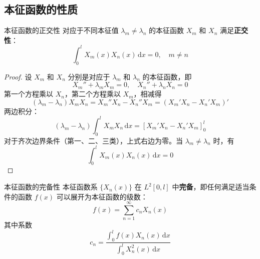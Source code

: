 \subsection{本征函数的性质}

\begin{dingli}{本征函数的正交性}{}
对应于不同本征值 $\lambda_m \neq \lambda_n$ 的本征函数 $X_m$ 和 $X_n$ 满足\textbf{正交性}：
\begin{equation}
    \int_0^l X_m(x)X_n(x)\,\mathrm{d}x = 0, \quad m \neq n
\end{equation}
\end{dingli}

\begin{proof}
设 $X_m$ 和 $X_n$ 分别是对应于 $\lambda_m$ 和 $\lambda_n$ 的本征函数，即
\begin{equation}
    X_m'' + \lambda_m X_m = 0, \quad X_n'' + \lambda_n X_n = 0
\end{equation}
第一个方程乘以 $X_n$，第二个方程乘以 $X_m$，相减得
\begin{equation}
    (\lambda_m - \lambda_n)X_m X_n = X_m'' X_n - X_n'' X_m = (X_m' X_n - X_n' X_m)'
\end{equation}
两边积分：
\begin{equation}
    (\lambda_m - \lambda_n)\int_0^l X_m X_n\,\mathrm{d}x = \left[X_m' X_n - X_n' X_m\right]_0^l
\end{equation}
对于齐次边界条件（第一、二、三类），上式右边为零。当 $\lambda_m \neq \lambda_n$ 时，有
\begin{equation}
    \int_0^l X_m(x)X_n(x)\,\mathrm{d}x = 0
\end{equation}
\end{proof}
\begin{dingli}{本征函数的完备性}{}
本征函数系 $\{X_n(x)\}$ 在 $L^2[0, l]$ 中\textbf{完备}，即任何满足适当条件的函数 $f(x)$ 可以展开为本征函数的级数：
\begin{equation}
    f(x) = \sum_{n=1}^{\infty} c_n X_n(x)
\end{equation}
其中系数
\begin{equation}
    c_n = \frac{\displaystyle\int_0^l f(x)X_n(x)\,\mathrm{d}x}{\displaystyle\int_0^l X_n^2(x)\,\mathrm{d}x}
\end{equation}
\end{dingli}

